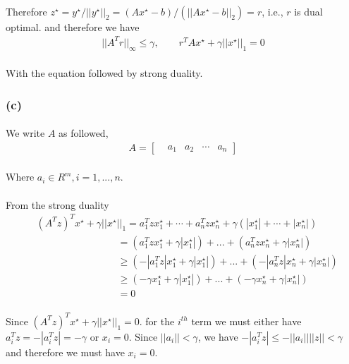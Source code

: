 \paragraph{}
Therefore $z^\star = y^\star/||y^\star||_2 =(Ax^\star-b)/(||Ax^\star -b||_2)=r$, i.e., $r$ is dual optimal. and therefore we have
\begin{align*}
||A^Tr||_\infty \leq \gamma, \qquad r^TAx^\star +\gamma||x^\star||_1=0
\end{align*}
\paragraph{}
With the equation followed by strong duality.
\subsubsection*{(c)}
\paragraph{}
We write $A$ as followed,
\begin{align*}
A = \begin{bmatrix}
&a_1 &a_2 &\cdots &a_n
\end{bmatrix}
\end{align*}
\paragraph{}
Where $a_i \in R^m, i=1,...,n$.
\paragraph{}
From the strong duality
\begin{align*}
&(A^Tz)^Tx^\star+\gamma||x^\star||_1 = a_1^Tzx_1^\star + \cdots + a_n^Tzx_n^\star +\gamma(|x_1^\star|+\cdots+|x_n^\star|) \\
&\qquad \qquad \qquad \qquad \ = (a_1^Tzx_1^\star +\gamma|x_1^\star|)+...+(a_n^Tzx_n^\star +\gamma|x_n^\star|)\\
&\qquad \qquad \qquad \qquad \ \geq(-|a_1^Tz|x_1^\star +\gamma|x_1^\star|)+...+(-|a_n^Tz|x_n^\star +\gamma|x_n^\star|)\\
&\qquad \qquad \qquad \qquad \ \geq(-\gamma x_1^\star +\gamma|x_1^\star|)+...+(-\gamma x_n^\star +\gamma|x_n^\star|)\\
&\qquad \qquad \qquad \qquad \ =0
\end{align*}
\paragraph{}
Since $(A^Tz)^Tx^\star+\gamma||x^\star||_1 =0$. for the $i^{th}$ term we must either have $a_i^Tz = -|a_i^Tz| = -\gamma$ or $x_i=0$. Since $||a_i|| < \gamma$, we have $-|a_i^Tz| \leq -||a_i||||z|| < \gamma$ and therefore we must have $x_i=0$.
